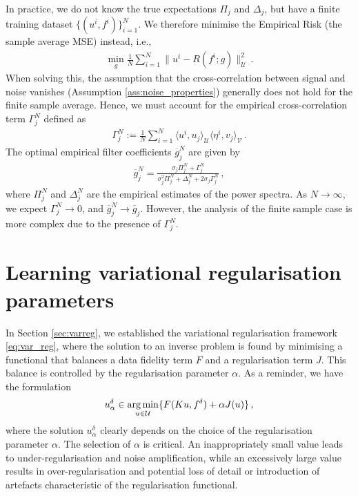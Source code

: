 In practice, we do not know the true expectations $\Pi_j$ and $\Delta_j$, but have a finite training dataset $\{(u^i, f^i)\}_{i=1}^N$. We therefore minimise the Empirical Risk (the sample average MSE) instead, i.e.,
\begin{align*}
\min_g \frac{1}{N} \sum_{i=1}^N \|u^i - R(f^i; g)\|_{\mathcal{U}}^2 \, .
\end{align*}
When solving this, the assumption that the cross-correlation between signal and noise vanishes (Assumption \ref{ass:noise_properties}) generally does not hold for the finite sample average. Hence, we must account for the empirical cross-correlation term $\Gamma_j^N$ defined as
\begin{align*}
\Gamma_j^N := \frac{1}{N} \sum_{i=1}^N \langle u^i, u_j \rangle_{\mathcal{U}} \langle \eta^i, v_j \rangle_{\mathcal{V}} \, .
\end{align*}
The optimal empirical filter coefficients $\overline{g}_j^N$ are given by \cite[Remark 3]{kabri_convergent_2024}
\begin{align*}
\overline{g}_j^N = \frac{\sigma_j \Pi_j^N + \Gamma_j^N}{\sigma_j^2 \Pi_j^N + \Delta_j^N + 2 \sigma_j \Gamma_j^N} \, ,
\end{align*}
where $\Pi_j^N$ and $\Delta_j^N$ are the empirical estimates of the power spectra. As $N \to \infty$, we expect $\Gamma_j^N \to 0$, and $\overline{g}_j^N \to \overline{g}_j$. However, the analysis of the finite sample case is more complex due to the presence of $\Gamma_j^N$.

\section{Learning variational regularisation parameters}
In Section \ref{sec:varreg}, we established the variational regularisation framework \eqref{eq:var_reg}, where the solution to an inverse problem is found by minimising a functional that balances a data fidelity term $F$ and a regularisation term $J$. This balance is controlled by the regularisation parameter $\alpha$. As a reminder, we have the formulation
\begin{align*}
u_\alpha^\delta \in \operatorname*{arg\,min}_{u \in \mathcal{U}} \{ F(K u, f^\delta) + \alpha J(u) \} \, ,
\end{align*}
where the solution $u_\alpha^\delta$ clearly depends on the choice of the regularisation parameter $\alpha$. The selection of $\alpha$ is critical. An inappropriately small value leads to under-regularisation and noise amplification, while an excessively large value results in over-regularisation and potential loss of detail or introduction of artefacts characteristic of the regularisation functional.

